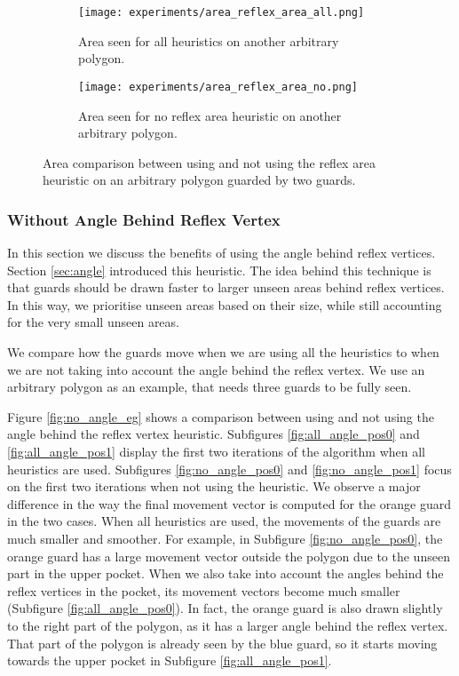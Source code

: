 

\begin{figure}[h!]
    \centering
    \begin{subfigure}{0.45\textwidth}
        \texttt{[image: experiments/area\_reflex\_area\_all.png]}
        \caption{Area seen for all heuristics on another arbitrary polygon.}
        \label{fig:area_reflex_area_all}
    \end{subfigure}
    \hfill
    \begin{subfigure}{0.45\textwidth}
        \texttt{[image: experiments/area\_reflex\_area\_no.png]}
        \caption{Area seen for no reflex area heuristic on another arbitrary polygon.}
        \label{fig:area_reflex_area_no}
    \end{subfigure}
    \caption{Area comparison between using and not using the reflex area heuristic on an arbitrary polygon guarded by two guards.}
    \label{fig:area_reflex_area}
\end{figure}

\subsubsection{Without Angle Behind Reflex Vertex}
In this section we  discuss the benefits of using the angle behind reflex vertices. Section \ref{sec:angle} introduced this heuristic. The idea behind this technique is that guards should be drawn faster to larger unseen areas behind reflex vertices. 
In this way, we prioritise unseen areas based on their size, while still accounting for the very small unseen areas.

We  compare how the guards move when we are using all the heuristics to when we are not taking into account the angle behind the reflex vertex. We  use an arbitrary polygon as an example, that needs three guards to be fully seen.

Figure \ref{fig:no_angle_eg} shows a comparison between using and not using the angle behind the reflex vertex heuristic. Subfigures \ref{fig:all_angle_pos0} and \ref{fig:all_angle_pos1} display the first two iterations of the algorithm when all heuristics are used. Subfigures \ref{fig:no_angle_pos0} and \ref{fig:no_angle_pos1} focus on the first two iterations when not using the heuristic.
We  observe a major difference in the way the final movement vector is computed for the orange guard in the two cases. When all heuristics are used, the movements of the guards are much smaller and smoother. For example, in Subfigure \ref{fig:no_angle_pos0}, the orange guard has a large movement vector outside the polygon due to the unseen part in the upper pocket. When we also take into account the angles behind the reflex vertices in the pocket, its movement vectors become much smaller (Subfigure \ref{fig:all_angle_pos0}). In fact, the orange guard is also drawn slightly to the right part of the polygon, as it has a larger angle behind the reflex vertex. That part of the polygon is already seen by the blue guard, so it starts moving towards the upper pocket in Subfigure \ref{fig:all_angle_pos1}.

